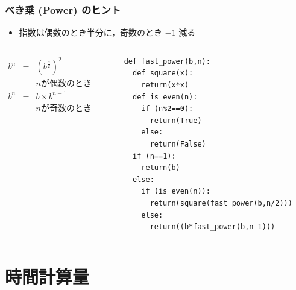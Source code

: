 \begin{frame}
\frametitle{べき乗 (Power) のヒント}
  \begin{itemize}
\item 指数は偶数のとき半分に，奇数のとき $-1$ 減る
  \end{itemize}
  \begin{columns}
    \begin{column}{0.45\textwidth}
      \begin{math}
        \begin{array}{rcl}
b^n &=& (b^{\frac{n}{2}})^{2}\\
&& n \mbox{が偶数のとき}\\
b^n &=& b \times b^{n-1}\\
&& n \mbox{が奇数のとき}
        \end{array}
      \end{math}
    \end{column}
    \begin{column}{0.5\textwidth}
      \begin{lstlisting}[caption={power.py},label=fast_power]
def fast_power(b,n):
  def square(x):
    return(x*x)
  def is_even(n):
    if (n%2==0):
      return(True)
    else:
      return(False)
  if (n==1):
    return(b) 
  else:
    if (is_even(n)):
      return(square(fast_power(b,n/2)))
    else:
      return((b*fast_power(b,n-1)))
      \end{lstlisting}
    \end{column}
  \end{columns}
\end{frame}
\section{時間計算量}
